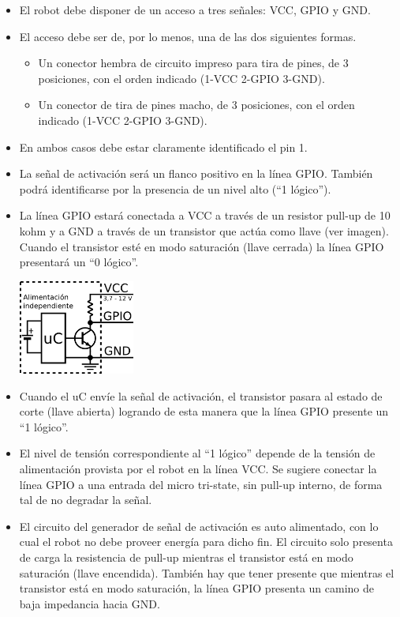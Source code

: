 \documentclass[a4paper,11pt]{article}
\begin{document}
\begin{itemize}
  \item El robot debe disponer de un acceso a tres señales: VCC, GPIO y GND.
  \item El acceso debe ser de, por lo menos, una de las dos siguientes formas.
  \begin{itemize}
    \item Un conector hembra de circuito impreso para tira de pines, de 3 posiciones, con el orden indicado (1-VCC 2-GPIO 3-GND).
    \item Un conector de tira de pines macho, de 3 posiciones, con el orden indicado (1-VCC 2-GPIO 3-GND).
  \end{itemize}
  \item En ambos casos debe estar claramente identificado el pin 1.
  \item La señal de activación será un flanco positivo en la línea GPIO. También podrá identificarse por la presencia de un nivel alto (``1 lógico'').
  \item La línea GPIO estará conectada a VCC a través de un resistor pull-up de 10 kohm y a GND a través de un transistor que actúa como llave (ver imagen). Cuando el transistor esté en modo saturación (llave cerrada) la línea GPIO presentará un ``0 lógico''.
  \begin{center}
    \includegraphics[width=0.3\textwidth]{signalstarter_sch.png}
  \end{center}
  \item Cuando el uC envíe la señal de activación, el transistor pasara al estado de corte (llave abierta) logrando de esta manera que la línea GPIO presente un ``1 lógico''.
  \item El nivel de tensión correspondiente al ``1 lógico'' depende de la tensión de alimentación provista por el robot en la línea VCC. Se sugiere conectar la línea GPIO a una entrada del micro tri-state, sin pull-up interno, de forma tal de no degradar la señal.
  \item El circuito del generador de señal de activación es auto alimentado, con lo cual el robot no debe proveer energía para dicho fin. El circuito solo presenta de carga la resistencia de pull-up mientras el transistor está en modo saturación (llave encendida). También hay que tener presente que mientras el transistor está en modo saturación, la línea GPIO presenta un camino de baja impedancia hacia GND.

\end{itemize}
\end{document}
